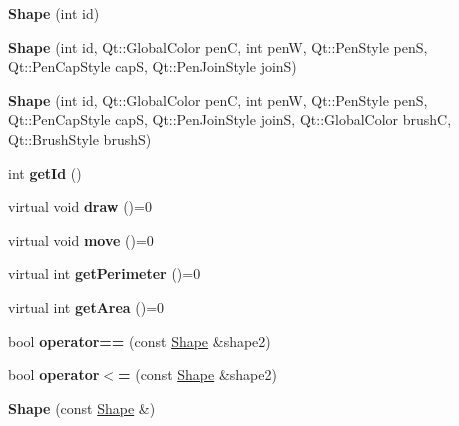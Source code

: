 \begin{DoxyCompactItemize}
\item 
\mbox{\label{class_shape_a058f2fada39a73f6640f15a0ac715ba9}} 
{\bfseries Shape} (int id)
\item 
\mbox{\label{class_shape_a5d5b669bf375fd84f66c47936649cae6}} 
{\bfseries Shape} (int id, Qt\+::\+Global\+Color penC, int penW, Qt\+::\+Pen\+Style penS, Qt\+::\+Pen\+Cap\+Style capS, Qt\+::\+Pen\+Join\+Style joinS)
\item 
\mbox{\label{class_shape_aa6c604f5b5836cf4f754e823e20aaac6}} 
{\bfseries Shape} (int id, Qt\+::\+Global\+Color penC, int penW, Qt\+::\+Pen\+Style penS, Qt\+::\+Pen\+Cap\+Style capS, Qt\+::\+Pen\+Join\+Style joinS, Qt\+::\+Global\+Color brushC, Qt\+::\+Brush\+Style brushS)
\item 
\mbox{\label{class_shape_ad24c5659cb3bdbeb8881b62a8402df98}} 
int {\bfseries get\+Id} ()
\item 
\mbox{\label{class_shape_afacc5aad8e37308c3ce8fef768199b05}} 
virtual void {\bfseries draw} ()=0
\item 
\mbox{\label{class_shape_a7e615d857e9ff5f1ad28a04bcd5d4e79}} 
virtual void {\bfseries move} ()=0
\item 
\mbox{\label{class_shape_a5c48c218574bbdd03cee949b0375820a}} 
virtual int {\bfseries get\+Perimeter} ()=0
\item 
\mbox{\label{class_shape_a04eb100a2d610e742f9f60f88e18fa12}} 
virtual int {\bfseries get\+Area} ()=0
\item 
\mbox{\label{class_shape_ad63168173d9f946230ca75277807163d}} 
bool {\bfseries operator==} (const \mbox{\hyperlink{class_shape}{Shape}} \&shape2)
\item 
\mbox{\label{class_shape_aea09877f437758ffe34b2414c17b826d}} 
bool {\bfseries operator$<$=} (const \mbox{\hyperlink{class_shape}{Shape}} \&shape2)
\item 
\mbox{\label{class_shape_a33d41873210e01fc1681dda1484d614f}} 
{\bfseries Shape} (const \mbox{\hyperlink{class_shape}{Shape}} \&)
\end{DoxyCompactItemize}

